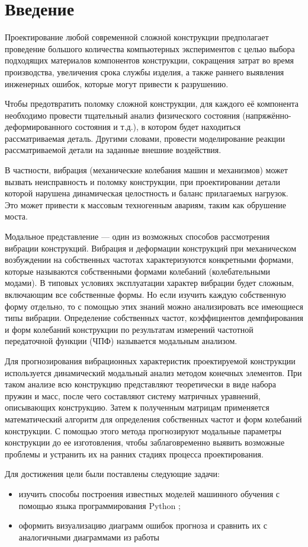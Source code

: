 \chapter*{Введение} %

Проектирование любой современной сложной конструкции предполагает проведение большого количества компьютерных экспериментов с целью выбора подходящих материалов компонентов конструкции, сокращения затрат во время производства, увеличения срока службы изделия, а также раннего выявления инженерных ошибок, которые могут привести к разрушению.

Чтобы предотвратить поломку сложной конструкции, для каждого её компонента необходимо провести тщательный анализ физического состояния (напряжённо-деформированного состояния и т.д.), в котором будет находиться рассматриваемая деталь. Другими словами, провести моделирование реакции рассматриваемой детали на заданные внешние воздействия.

В частности, вибрация (механические колебания машин и механизмов) может вызвать неисправность и поломку конструкции, при проектировании детали которой нарушена динамическая целостность и баланс прилагаемых нагрузок. Это может привести к массовым техногенным авариям, таким как обрушение моста.

Модальное представление — один из возможных способов рассмотрения вибрации конструкций. Вибрация и деформации конструкций при механическом возбуждении на собственных частотах характеризуются конкретными формами, которые называются собственными формами колебаний (колебательными модами). В типовых условиях эксплуатации характер вибрации будет сложным, включающим все собственные формы. Но если изучить каждую собственную форму отдельно, то с помощью этих знаний можно анализировать все имеющиеся типы вибрации. Определение собственных частот, коэффициентов демпфирования и форм колебаний конструкции по результатам измерений частотной передаточной функции (ЧПФ) называется модальным анализом.

Для прогнозирования вибрационных характеристик проектируемой конструкции используется динамический модальный анализ методом конечных элементов. При таком анализе всю конструкцию представляют теоретически в виде набора пружин и масс, после чего составляют систему матричных уравнений, описывающих конструкцию. Затем к полученным матрицам применяется математический алгоритм для определения собственных частот и форм колебаний конструкции. С помощью этого метода прогнозируют модальные параметры конструкции до ее изготовления, чтобы заблаговременно выявить возможные проблемы и устранить их на ранних стадиях процесса проектирования.

Для достижения цели были поставлены следующие задачи:
\begin{itemize}
	\item изучить способы построения известных моделей машинного обучения с помощью языка программирования Python \cite{brownlee_alg, sklearn_doc};
	\item оформить визуализацию диаграмм ошибок прогноза и сравнить их с аналогичными диаграммами из работы \cite{muravtsev:metamodel}
\end{itemize}
